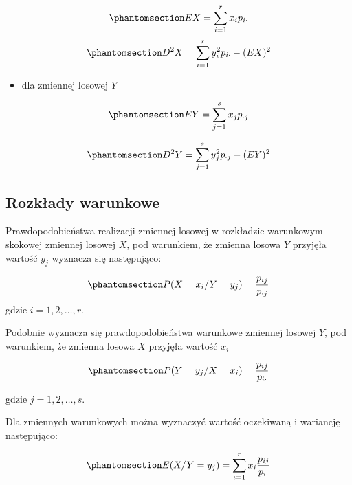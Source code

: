 \documentclass[
  letterpaper,
  DIV=11,
  numbers=noendperiod]{scrreprt}
\providecommand{\tightlist}{%
  \setlength{\itemsep}{0pt}\setlength{\parskip}{0pt}}\usepackage{longtable,booktabs,array}
\begin{document}
\begin{equation}\phantomsection\label{eq-EX}{ EX = \sum_{i=1}^rx_ip_{i\cdot}}\end{equation}
\begin{equation}\phantomsection\label{eq-D2X}{ D^2X = \sum_{i=1}^ry_i^2p_{i\cdot} - (EX)^2}\end{equation}

\begin{itemize}
\tightlist
\item
  dla zmiennej losowej \(Y\)
\end{itemize}

\begin{equation}\phantomsection\label{eq-EY}{ EY = \sum_{j=1}^sx_jp_{\cdot j}}\end{equation}

\begin{equation}\phantomsection\label{eq-D2Y}{ D^2Y = \sum_{j=1}^sy_j^2p_{\cdot j} - (EY)^2}\end{equation}

\subsection{Rozkłady warunkowe}\label{rozkux142ady-warunkowe}

Prawdopodobieństwa realizacji zmiennej losowej w rozkładzie warunkowym
skokowej zmiennej losowej \(X\), pod warunkiem, że zmienna losowa \(Y\)
przyjęła wartość \(y_j\) wyznacza się następująco:

\begin{equation}\phantomsection\label{eq-roz_war_X}{ P(X=x_i/Y=y_j) = \frac{p_{ij}}{p_{\cdot j}}}\end{equation}
gdzie \(i = 1, 2, \ldots, r\).

Podobnie wyznacza się prawdopodobieństwa warunkowe zmiennej losowej
\(Y\), pod warunkiem, że zmienna losowa \(X\) przyjęła wartość \(x_i\)

\begin{equation}\phantomsection\label{eq-roz_war_Y}{ P(Y=y_j/X=x_i) = \frac{p_{ij}}{p_{i \cdot}}}\end{equation}

gdzie \(j = 1, 2, \ldots, s\).

Dla zmiennych warunkowych można wyznaczyć wartość oczekiwaną i wariancję
następująco:

\begin{equation}\phantomsection\label{eq-war_EX}{E(X/Y=y_j)=\sum_{i=1}^rx_i\frac{p_{ij}}{p_{i \cdot}}}\end{equation}
\end{document}
